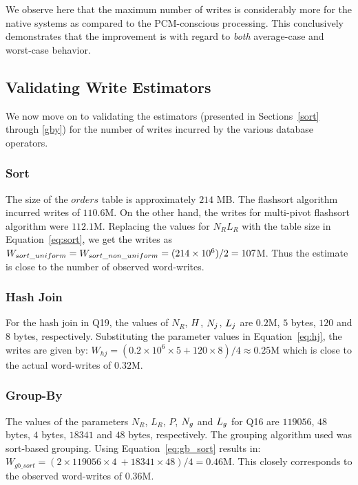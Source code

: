 We observe here that the maximum number of writes is considerably more for the
native systems as compared to the PCM-conscious processing. This
conclusively demonstrates that the improvement is with regard to
\emph{both} average-case and worst-case behavior.

\subsection{Validating Write Estimators}
\label{sec:validation}

We now move on to validating the estimators
(presented in Sections~\ref{sort} through \ref{gby})  for the number of
writes incurred by the various database operators.

\subsubsection{Sort}
The size of the $orders$ table is approximately $214$ MB. 
The flashsort algorithm incurred writes of $110.6$M. On the other hand,
the writes for multi-pivot flashsort algorithm were $112.1$M.
Replacing the values for $N_R L_R$ with the table size in Equation~\ref{eq:sort},
we get the writes as 
$W_{sort\_uniform} = W_{sort\_non\_uniform} = (214 \times 10^6)/2 = 107$M.
\noindent
Thus the estimate is close to the number of observed word-writes.



\subsubsection{Hash Join}
For the hash join in Q19, the values of $N_R$, $H$, $N_j$,
$L_j$ are $0.2$M, $5$ bytes, $120$ and $8$ bytes, respectively. 
Substituting the parameter values in Equation~\ref{eq:hj}, the writes are given by:  
$W_{hj} = (0.2 \times 10^6 \times 5  + 120 \times 8)/4  \approx 0.25$M 
\noindent
which is close to the actual word-writes of $0.32$M.

  
\subsubsection{Group-By}
The values of the parameters $N_R$, $L_R$, $P$, $N_g$ and $L_g$ for Q16
are $119056$, $48$ bytes, $4$ bytes, $18341$ and $48$ bytes, respectively.  
The grouping algorithm used was sort-based grouping. Using Equation~\ref{eq:gb_sort} results in:
$W_{gb\_sort} = (2 \times 119056 \times 4 \  + 18341 \times 48)/4 = 0.46$M. 
\noindent
This closely corresponds to the observed word-writes of $0.36$M.
\\

